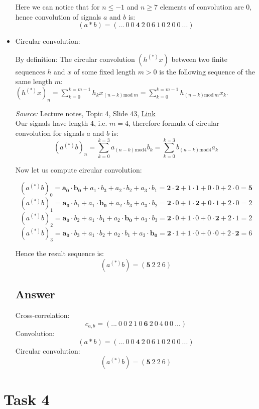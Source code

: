 \documentclass{article}
\begin{document}
\begin{itemize}
    Here we can notice that for $n\leq-1$ and $n\geq7$ elements of convolution are 0, hence convolution of signals $a$ and $b$ is:
    $$(a*b)=(...\ 0\ 0\ \pmb{4}\ 2\ 0\ 6\ 1\ 0\ 2\ 0\ 0\ ...)$$
    
    \item Circular convolution:
    
    By definition: The circular convolution $(h^{(*)}x)$ between two finite sequences $h$ and $x$ of some fixed length $m>0$ is the following sequence of the same length $m$:\\ $(h^{(*)}x)_n=\sum^{k=m-1}_{k=0}h_kx_{(n-k)\text{mod}\ m}=\sum^{k=m-1}_{k=0}h_{(n-k)\text{mod}\ m}x_k$.
    
    \emph{Source:} Lecture notes, Topic 4, Slide 43, \href{https://moodle.innopolis.university/pluginfile.php/143329/mod_resource/content/1/DSPt4spr21.pdf}{Link}\\
    
    Our signals have length 4, i.e. $m=4$, therefore formula of circular convolution for signals $a$ and $b$ is:
    $$(a^{(*)}b)_n=\sum^{k=3}_{k=0}a_{(n-k)\text{mod}4}b_k=\sum^{k=3}_{k=0}b_{(n-k)\text{mod}4}a_k$$

\newpage   
Now let us compute circular convolution:
    
    $$(a^{(*)}b)_0=\pmb{a_0}\cdot\pmb{b_0}+a_1\cdot b_3+a_2\cdot b_2+a_3\cdot b_1=
    \pmb{2}\cdot\pmb{2}+1\cdot1+0\cdot0+2\cdot0=\pmb{5}$$
    $$(a^{(*)}b)_1=\pmb{a_0}\cdot b_1+a_1\cdot \pmb{b_0}+a_2\cdot b_{3}+a_3\cdot b_{2}=
    \pmb{2}\cdot0+1\cdot\pmb{2}+0\cdot1+2\cdot0=2$$
    $$(a^{(*)}b)_2=\pmb{a_0}\cdot b_2+a_1\cdot b_1+a_2\cdot \pmb{b_{0}}+a_3\cdot b_{3}=
    \pmb{2}\cdot0+1\cdot0+0\cdot\pmb{2}+2\cdot1=2$$
    $$(a^{(*)}b)_3=\pmb{a_0}\cdot b_3+a_1\cdot b_2+a_2\cdot b_1+a_3\cdot \pmb{b_{0}}=
    \pmb{2}\cdot1+1\cdot0+0\cdot0+2\cdot\pmb{2}=6$$
    
    Hence the result sequence is:
    $$(a^{(*)}b)=(\pmb{5}\ 2\ 2\ 6)$$
    
    \subsection{Answer}
    Cross-correlation:
    $$c_{a,b}=(...\ 0\ 0\ 2\ 1\ 0\ \pmb{6}\ 2\ 0\ 4\ 0\ 0\ ...)$$
    Convolution:
    $$(a*b)=(...\ 0\ 0\ \pmb{4}\ 2\ 0\ 6\ 1\ 0\ 2\ 0\ 0\ ...)$$
    Circular convolution:
    $$(a^{(*)}b)=(\pmb{5}\ 2\ 2\ 6)$$
\end{itemize}

\section{Task 4}
\end{document}
